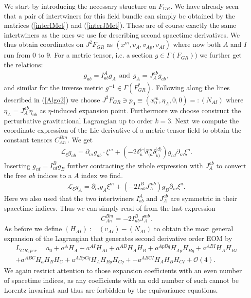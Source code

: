 \documentclass[a4paper,12pt, DIV=14, BCOR=5mm, twoside, headsepline, numbers=noenddot]{scrbook}
\begin{document}
We start by introducing the necessary structure on $F_{GR}$. We have already seen that a pair of intertwiners for this field bundle can simply be obtained by the matrices  (\ref{interIMet}) and (\ref{interJMet}). These are of course exactly the same intertwiners as the ones we use for describing second spacetime derivatives. We thus obtain coordinates on $J^2F_{GR}$ as $(x^m,v_A,v_{Ap},v_{AI})$ where now both $A$ and $I$ run from 0 to 9. For a metric tensor, i.e. a section $g \in \Gamma(F_{GR}))$ we further get the relations:
\begin{align}
    g_{ab} = I^A _{ab} g_A \ \ \text{and} \ \ g_A = J^{ab}_{A} g_{ab},
\end{align}
and similar for the inverse metric $g^{-1} \in \Gamma(F_{GR}^{\ast})$.
Following along the lines described in (\ref{Algo2}) we choose $J^2F_{GR} \ni p_0 \equiv (x_0^m,\eta_A,0,0) =: (N_{AI})$ where $\eta_A = J^{ab}_A \eta_{ab}$ as $\eta$-induced expansion point. Furthermore we choose construct the perturbative gravitational Lagrangian up to order $k=3$. 
Next we compute the coordinate expression of the Lie derivative of a metric tensor field to obtain the constant tensors $C_{An}^{Bm}$. We get
\begin{align}
    \mathcal{L}_{\xi} g_{ab} = \partial_m g_{ab} \cdot \xi^m + \left (-2 \delta_n^{(c\vert} \delta_{(a}^m \delta_{b)}^{\vert d)} \right ) g_{cd} \partial_m \xi^n.
\end{align}
Inserting $g_{cd} = I^B_{cd} g_B$ further contracting the whole expression with $J^{ab}_A$ to convert the free $ab$ indices to a $A$ index we find.
\begin{align}
    \mathcal{L}_{\xi} g_A = \partial_m g_A \xi^m + \left (-2 I^B_{nb}J^{mb}_{A} \right )g_B \partial_m \xi ^n. 
\end{align}
Here we also used that the two intertwiners $I^A_{ab}$ and $J_A^{ab}$ are symmetric in their spacetime indices. Thus we can simply read of from the last expression
\begin{align}
    C_{An}^{Bm} = -2 I^B_{nb}J_A^{mb}.
\end{align}
As before we define $(H_{AI}) := (v_{AI}) - (N_{AI})$ to obtain the most general expansion of the Lagrangian that generates second derivative order EOM by
\begin{align}\label{LGR}
    L_{GR,per} =  a_0 + a^A H_A + a^{AI}H_{AI} + a^{AB} H_{A}H_{B} + a^{ApBq} H_{Ap}H_{Bq} + a^{ABI} H_{A} H_{BI} \\
    + a^{ABC} H_a H_B H_C + a^{ABpCq} H_{A}H_{Bp}H_{Cq} +
    + a^{ABCI} H_A H_B H_{CI} 
    + \mathcal{O}(4).
\end{align}
We again restrict attention to those expansion coefficients with an even number of spacetime indices, as any coefficients with an odd number of such cannot be Lorentz invariant and thus are forbidden by the equivariance equations.
\end{document}
